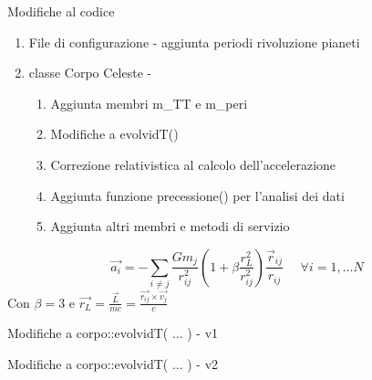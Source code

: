     \begin{frame}{Modifiche al codice}
        \begin{block}{}
        \begin{enumerate}
            \item File di configurazione - aggiunta periodi rivoluzione pianeti
            \item classe Corpo Celeste  -
            \begin{enumerate}[a]
                \item Aggiunta membri m\_TT e m\_peri
                \item Modifiche a evolvidT()
                \item Correzione relativistica al calcolo dell'accelerazione
                \item Aggiunta funzione precessione() per l'analisi dei dati
                \item Aggiunta altri membri e metodi di servizio 
            \end{enumerate}
        \end{enumerate}
        \end{block}
        \begin{equation}
            \vec{a_i} = -\sum_{i\neq j}\frac{Gm_j}{r_{ij}^2}(1+\beta\frac{r_L^2}{r_{ij}^2})\frac{\vec r_{ij}}{r_{ij}}\,\,\,\,\,\,\,\,\forall i=1,\dots N
        \end{equation}
        \centering
        Con $\beta=3$ e $\vec{r_L}=\frac{\vec{L}}{mc}=\frac{\vec{r_{ij}}\times\vec{v_j}}{c}$
    \end{frame}

    \begin{frame}{Modifiche a corpo::evolvidT( ... ) - v1}
        
    \end{frame}
    \begin{frame}{Modifiche a corpo::evolvidT( ... ) - v2}
        
    \end{frame}

